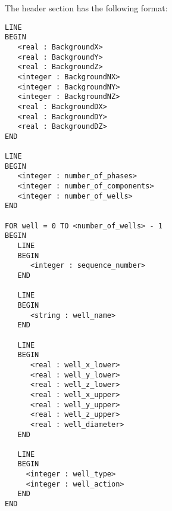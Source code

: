 \noindent
The header section has the following format:
\begin{display}\begin{verbatim}
LINE
BEGIN
   <real : BackgroundX>
   <real : BackgroundY>
   <real : BackgroundZ>
   <integer : BackgroundNX>
   <integer : BackgroundNY>
   <integer : BackgroundNZ>
   <real : BackgroundDX>
   <real : BackgroundDY>
   <real : BackgroundDZ>
END

LINE
BEGIN
   <integer : number_of_phases>
   <integer : number_of_components>
   <integer : number_of_wells>
END

FOR well = 0 TO <number_of_wells> - 1
BEGIN
   LINE
   BEGIN
      <integer : sequence_number>
   END

   LINE
   BEGIN
      <string : well_name>
   END

   LINE
   BEGIN
      <real : well_x_lower>
      <real : well_y_lower>
      <real : well_z_lower>
      <real : well_x_upper>
      <real : well_y_upper>
      <real : well_z_upper>
      <real : well_diameter>
   END

   LINE
   BEGIN
     <integer : well_type>
     <integer : well_action>
   END
END
\end{verbatim}\end{display}

